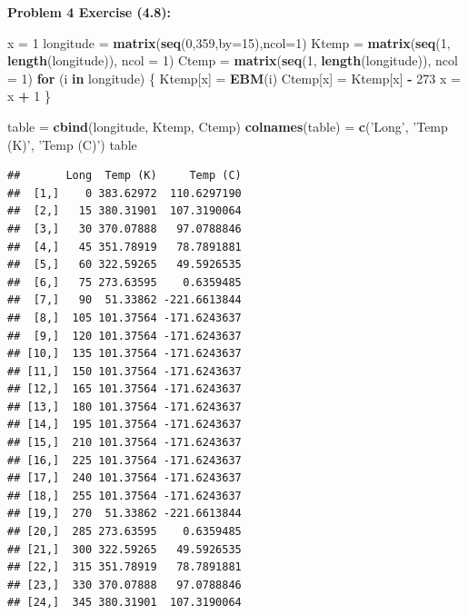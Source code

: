 \documentclass[11pt]{article}
\newenvironment{problem}[1]{\textbf{Problem #1: }}{\newpage}
\newenvironment{Shaded}{\begin{snugshade}}{\end{snugshade}}
\newcommand{\ControlFlowTok}[1]{\textcolor[rgb]{0.13,0.29,0.53}{\textbf{#1}}}
\newcommand{\DataTypeTok}[1]{\textcolor[rgb]{0.13,0.29,0.53}{#1}}
\newcommand{\DecValTok}[1]{\textcolor[rgb]{0.00,0.00,0.81}{#1}}
\newcommand{\KeywordTok}[1]{\textcolor[rgb]{0.13,0.29,0.53}{\textbf{#1}}}
\newcommand{\NormalTok}[1]{#1}
\newcommand{\OperatorTok}[1]{\textcolor[rgb]{0.81,0.36,0.00}{\textbf{#1}}}
\newcommand{\StringTok}[1]{\textcolor[rgb]{0.31,0.60,0.02}{#1}}
\begin{document}
\begin{problem}{4 Exercise (4.8)}
\begin{Shaded}
\begin{Highlighting}[]
{  \KeywordTok{return}\NormalTok{(}\KeywordTok{uniroot}\NormalTok{(fEBM,}\KeywordTok{c}\NormalTok{(}\DecValTok{0}\NormalTok{,}\DecValTok{500}\NormalTok{))[[}\DecValTok{1}\NormalTok{]])}
\NormalTok{\}}
\end{Highlighting}
\end{Shaded}
\newpage
\begin{Shaded}
\begin{Highlighting}
\NormalTok{x =}\StringTok{ }\DecValTok{1}
\NormalTok{longitude =}\StringTok{ }\KeywordTok{matrix}\NormalTok{(}\KeywordTok{seq}\NormalTok{(}\DecValTok{0}\NormalTok{,}\DecValTok{359}\NormalTok{,}\DataTypeTok{by=}\DecValTok{15}\NormalTok{),}\DataTypeTok{ncol=}\DecValTok{1}\NormalTok{)}
\NormalTok{Ktemp =}\StringTok{ }\KeywordTok{matrix}\NormalTok{(}\KeywordTok{seq}\NormalTok{(}\DecValTok{1}\NormalTok{, }\KeywordTok{length}\NormalTok{(longitude)), }\DataTypeTok{ncol =} \DecValTok{1}\NormalTok{)}
\NormalTok{Ctemp =}\StringTok{ }\KeywordTok{matrix}\NormalTok{(}\KeywordTok{seq}\NormalTok{(}\DecValTok{1}\NormalTok{, }\KeywordTok{length}\NormalTok{(longitude)), }\DataTypeTok{ncol =} \DecValTok{1}\NormalTok{)}
\ControlFlowTok{for}\NormalTok{ (i }\ControlFlowTok{in}\NormalTok{ longitude) \{}
\NormalTok{  Ktemp[x] =}\StringTok{ }\KeywordTok{EBM}\NormalTok{(i)}
\NormalTok{  Ctemp[x] =}\StringTok{ }\NormalTok{Ktemp[x] }\OperatorTok{-}\StringTok{ }\DecValTok{273}
\NormalTok{  x =}\StringTok{ }\NormalTok{x }\OperatorTok{+}\StringTok{ }\DecValTok{1}
\NormalTok{\}}

\NormalTok{table =}\StringTok{ }\KeywordTok{cbind}\NormalTok{(longitude, Ktemp, Ctemp)}
\KeywordTok{colnames}\NormalTok{(table) =}\StringTok{ }\KeywordTok{c}\NormalTok{(}\StringTok{'Long'}\NormalTok{, }\StringTok{'Temp (K)'}\NormalTok{, }\StringTok{'Temp (C)'}\NormalTok{)}
\NormalTok{table}
\end{Highlighting}
\end{Shaded}

\begin{verbatim}
##       Long  Temp (K)     Temp (C)
##  [1,]    0 383.62972  110.6297190
##  [2,]   15 380.31901  107.3190064
##  [3,]   30 370.07888   97.0788846
##  [4,]   45 351.78919   78.7891881
##  [5,]   60 322.59265   49.5926535
##  [6,]   75 273.63595    0.6359485
##  [7,]   90  51.33862 -221.6613844
##  [8,]  105 101.37564 -171.6243637
##  [9,]  120 101.37564 -171.6243637
## [10,]  135 101.37564 -171.6243637
## [11,]  150 101.37564 -171.6243637
## [12,]  165 101.37564 -171.6243637
## [13,]  180 101.37564 -171.6243637
## [14,]  195 101.37564 -171.6243637
## [15,]  210 101.37564 -171.6243637
## [16,]  225 101.37564 -171.6243637
## [17,]  240 101.37564 -171.6243637
## [18,]  255 101.37564 -171.6243637
## [19,]  270  51.33862 -221.6613844
## [20,]  285 273.63595    0.6359485
## [21,]  300 322.59265   49.5926535
## [22,]  315 351.78919   78.7891881
## [23,]  330 370.07888   97.0788846
## [24,]  345 380.31901  107.3190064
\end{verbatim}
			
	\end{problem}
\end{document}
